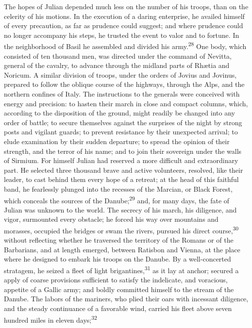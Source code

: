 The hopes of Julian depended much less on the number of his
troops, than on the celerity of his motions. In the execution of
a daring enterprise, he availed himself of every precaution, as
far as prudence could suggest; and where prudence could no longer
accompany his steps, he trusted the event to valor and to
fortune. In the neighborhood of Basil he assembled and divided
his army.\textsuperscript{28} One body, which consisted of ten thousand men, was
directed under the command of Nevitta, general of the cavalry, to
advance through the midland parts of Rhætia and Noricum. A
similar division of troops, under the orders of Jovius and
Jovinus, prepared to follow the oblique course of the highways,
through the Alps, and the northern confines of Italy. The
instructions to the generals were conceived with energy and
precision: to hasten their march in close and compact columns,
which, according to the disposition of the ground, might readily
be changed into any order of battle; to secure themselves against
the surprises of the night by strong posts and vigilant guards;
to prevent resistance by their unexpected arrival; to elude
examination by their sudden departure; to spread the opinion of
their strength, and the terror of his name; and to join their
sovereign under the walls of Sirmium. For himself Julian had
reserved a more difficult and extraordinary part. He selected
three thousand brave and active volunteers, resolved, like their
leader, to cast behind them every hope of a retreat; at the head
of this faithful band, he fearlessly plunged into the recesses of
the Marcian, or Black Forest, which conceals the sources of the
Danube;\textsuperscript{29} and, for many days, the fate of Julian was unknown to
the world. The secrecy of his march, his diligence, and vigor,
surmounted every obstacle; he forced his way over mountains and
morasses, occupied the bridges or swam the rivers, pursued his
direct course,\textsuperscript{30} without reflecting whether he traversed the
territory of the Romans or of the Barbarians, and at length
emerged, between Ratisbon and Vienna, at the place where he
designed to embark his troops on the Danube. By a well-concerted
stratagem, he seized a fleet of light brigantines,\textsuperscript{31} as it lay
at anchor; secured a apply of coarse provisions sufficient to
satisfy the indelicate, and voracious, appetite of a Gallic army;
and boldly committed himself to the stream of the Danube. The
labors of the mariners, who plied their oars with incessant
diligence, and the steady continuance of a favorable wind,
carried his fleet above seven hundred miles in eleven days;\textsuperscript{32}
